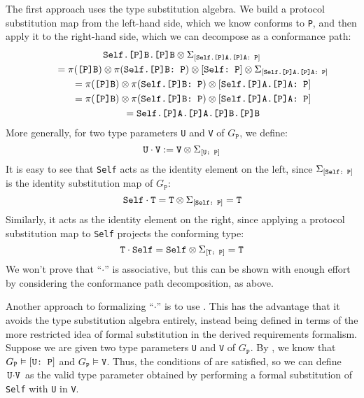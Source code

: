 \documentclass[../generics]{subfiles}
\begin{document}
The first approach uses the type substitution algebra. We build a protocol substitution map from the left-hand side, which we know conforms to \texttt{P}, and then apply it to the right-hand side, which we can decompose as a conformance path:
\begin{gather*}
\texttt{Self.[P]B.[P]B}\otimes\Sigma_{[\texttt{Self.[P]A.[P]A:~P}]}\\
\qquad {} = \pi(\texttt{[P]B}) \otimes \pi(\texttt{Self.[P]B:~P}) \otimes [\texttt{Self:~P}] \otimes \Sigma_{[\texttt{Self.[P]A.[P]A:~P}]}\\
\qquad {} = \pi(\texttt{[P]B}) \otimes \pi(\texttt{Self.[P]B:~P}) \otimes [\texttt{Self.[P]A.[P]A:~P}]\\
\qquad {} = \pi(\texttt{[P]B}) \otimes \pi(\texttt{Self.[P]B:~P}) \otimes [\texttt{Self.[P]A.[P]A:~P}]\\
\qquad {} = \texttt{Self.[P]A.[P]A.[P]B.[P]B}
\end{gather*}
More generally, for two type parameters \texttt{U} and \texttt{V} of $G_\texttt{P}$, we define:
\[\texttt{U}\cdot\texttt{V}:=\texttt{V}\otimes\Sigma_{[\texttt{U:~P}]}\]
It is easy to see that \texttt{Self} acts as the identity element on the left, since $\Sigma_{[\texttt{Self:~P}]}$ is the identity substitution map of $G_\texttt{P}$:
\[
\texttt{Self}\cdot\texttt{T} = \texttt{T}\otimes\Sigma_{[\texttt{Self:~P}]} = \texttt{T}
\]
Similarly, it acts as the identity element on the right, since applying a protocol substitution map to \texttt{Self} projects the conforming type:
\[
\texttt{T}\cdot\texttt{Self} = \texttt{Self}\otimes\Sigma_{[\texttt{T:~P}]} = \texttt{T}
\]
We won't prove that ``$\cdot$'' is associative, but this can be shown with enough effort by considering the conformance path decomposition, as above.

Another approach to formalizing ``$\cdot$'' is to use . This has the advantage that it avoids the type substitution algebra entirely, instead being defined in terms of the more restricted idea of formal substitution in the derived requirements formalism. Suppose we are given two type parameters \texttt{U} and \texttt{V} of $G_\texttt{P}$. By , we know that $G_\texttt{P}\vDash[\texttt{U:~P}]$ and $G_\texttt{P}\vDash\texttt{V}$. Thus, the conditions of  are satisfied, so we can define $\texttt{U}\cdot\texttt{V}$ as the valid type parameter obtained by performing a formal substitution of \texttt{Self} with \texttt{U} in \texttt{V}.
\end{document}
